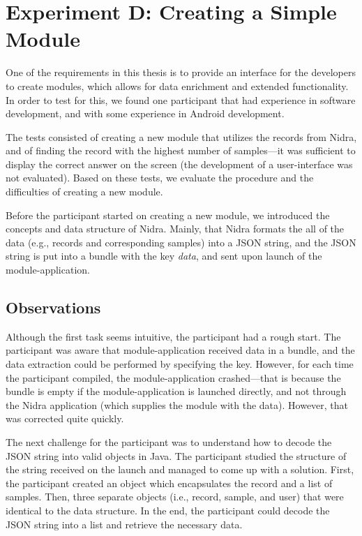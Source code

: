 \section{Experiment D: Creating a Simple Module}
One of the requirements in this thesis is to provide an interface for the developers to create modules, which allows for data enrichment and extended functionality. In order to test for this, we found one participant that had experience in software development, and with some experience in Android development.

 The tests consisted of creating a new module that utilizes the records from Nidra, and of finding the record with the highest number of samples---it was sufficient to display the correct answer on the screen (the development of a user-interface was not evaluated). Based on these tests, we evaluate the procedure and the difficulties of creating a new module. 

Before the participant started on creating a new module, we introduced the concepts and data structure of Nidra. Mainly, that Nidra formats the all of the data (e.g., records and corresponding samples) into a JSON string, and the JSON string is put into a bundle with the key \textit{data}, and sent upon launch of the module-application. 


\subsection{Observations}
Although the first task seems intuitive, the participant had a rough start. The participant was aware that module-application received data in a bundle, and the data extraction could be performed by specifying the key. However, for each time the participant compiled, the module-application crashed---that is because the bundle is empty if the module-application is launched directly, and not through the Nidra application (which supplies the module with the data). However, that was corrected quite quickly. 

The next challenge for the participant was to understand how to decode the JSON string into valid objects in Java. The participant studied the structure of the string received on the launch and managed to come up with a solution. First, the participant created an object which encapsulates the record and a list of samples. Then, three separate objects (i.e., record, sample, and user) that were identical to the data structure. In the end, the participant could decode the JSON string into a list and retrieve the necessary data.


